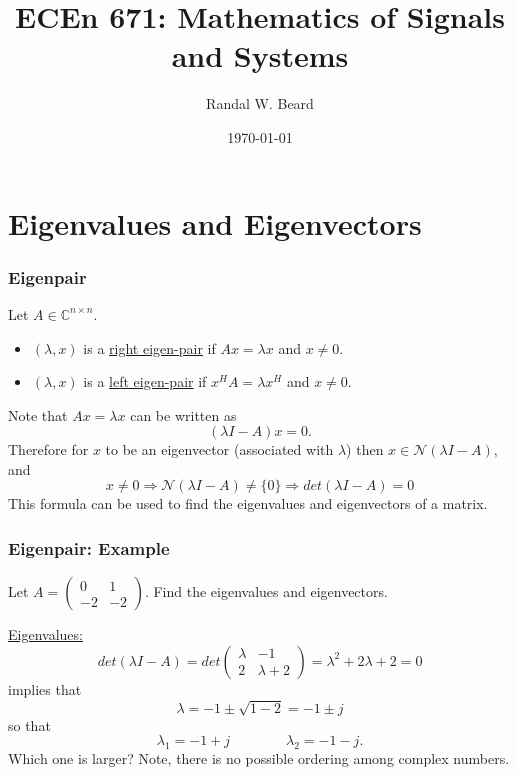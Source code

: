 \documentclass{beamer}
\title{ECEn 671: Mathematics of Signals and Systems}
\author{Randal W. Beard}
\institute{Brigham Young University}
\date{\today}
\begin{document}
\begin{frame}
	\titlepage
\end{frame}


\section{Eigenvalues and Eigenvectors}
\frame{\sectionpage}


\begin{frame}\frametitle{Eigenpair}
	Let $A\in\mathbb{C}^{n\times n}$.
	\begin{definition}
		\begin{itemize}
		  \item $(\lambda,x)$ is a \underline{right eigen-pair} if $Ax=\lambda x$ and $x \neq 0$.
		  \item $(\lambda,x)$ is a \underline{left eigen-pair} if $x^HA=\lambda x^H$ and $x\neq 0$.
		\end{itemize}		
	\end{definition}
	Note that $Ax = \lambda x$ can be written as
	\[ 
		(\lambda I - A)x = 0. 
	\]
	Therefore for $x$ to be an eigenvector (associated with $\lambda $) then $x\in\mathcal{N}(\lambda I-A)$, and
	\[
		x\neq 0 \Rightarrow \mathcal{N}(\lambda I-A) \neq \{0\} \Rightarrow det(\lambda I-A)=0 
	\]
	This formula can be used to find the eigenvalues and eigenvectors of a matrix.
\end{frame}

\begin{frame}\frametitle{Eigenpair: Example}
	Let $A = \begin{pmatrix}
	    0 & 1\\
	    -2 & -2
	  \end{pmatrix}$.  
	Find the eigenvalues and eigenvectors.
	
	\par\underline{Eigenvalues:}
		\[ 
		det(\lambda I - A) 
			= det\begin{pmatrix}
    				\lambda  & -1\\
   					 2 & \lambda +2
  				  \end{pmatrix} 
  			= \lambda^2 + 2\lambda  + 2 
  			= 0
  	\]
  	implies that
	\[ 
		\lambda  = -1 \pm \sqrt{1-2} 
		         = -1 \pm j 
	\]
	so that
	\[ 
		\lambda_1 = -1 + j 
		\qquad \qquad 
		\lambda_2 = -1 - j.
	\]
Which one is larger?  Note, there is no possible ordering among complex numbers.
	
\end{frame}
\end{document}
